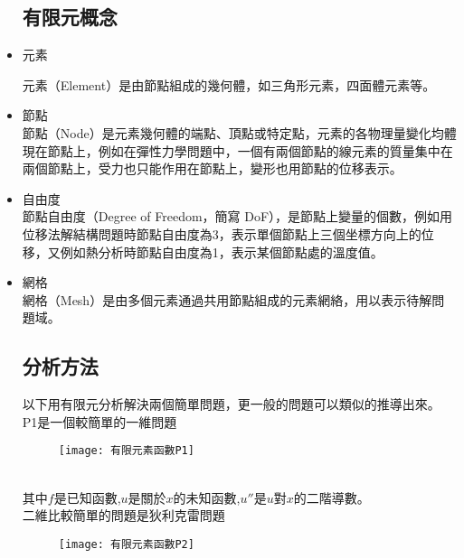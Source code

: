 \begin{itemize}
\subsection{有限元概念}

\item 元素\

\qquad 元素（Element）是由節點組成的幾何體，如三角形元素，四面體元素等。 \\
\item 節點\\

\qquad 節點（Node）是元素幾何體的端點、頂點或特定點，元素的各物理量變化均體現在節點上，例如在彈性力學問題中，一個有兩個節點的線元素的質量集中在兩個節點上，受力也只能作用在節點上，變形也用節點的位移表示。 \\
\item 自由度\\

\qquad 節點自由度（Degree of Freedom，簡寫 DoF），是節點上變量的個數，例如用位移法解結構問題時節點自由度為3，表示單個節點上三個坐標方向上的位移，又例如熱分析時節點自由度為1，表示某個節點處的溫度值。 \\
\item 網格\\

\qquad 網格（Mesh）是由多個元素通過共用節點組成的元素網絡，用以表示待解問題域。 \\

\subsection{分析方法}

\qquad 以下用有限元分析解決兩個簡單問題，更一般的問題可以類似的推導出來。\\
\qquad P1是一個較簡單的一維問題 \\
\begin{figure}[hbt!]
\begin{center}
\texttt{[image: 有限元素函數P1]}
\end{center}
\end{figure}
\\

\qquad 其中$ f$是已知函數,$ u$是關於$ x$的未知函數,$ u ″$是$ u$對$ x$的二階導數。\\
二維比較簡單的問題是狄利克雷問題 \\
\begin{figure}[hbt!]
\begin{center}
\texttt{[image: 有限元素函數P2]}
\end{center}
\end{figure}
\\


\end{itemize}
